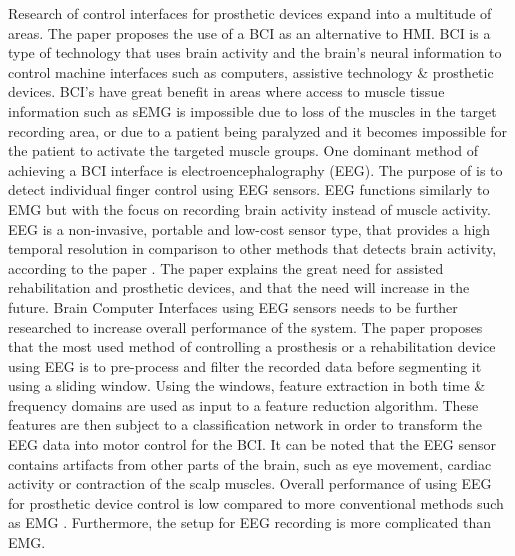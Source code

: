 \documentclass[../main.tex]{subfiles}
\begin{document}
Research of control interfaces for prosthetic devices expand into a multitude of areas.
The paper \cite{fnins2016} proposes the use of a \gls{BCI} as an alternative to \gls{HMI}.
BCI is a type of technology that uses brain activity and the brain's neural information to control machine interfaces such as computers, assistive technology \& prosthetic devices.
BCI's have great benefit in areas where access to muscle tissue information such as sEMG is impossible due to loss of the muscles in the target recording area, or due to a patient being paralyzed and it becomes impossible for the patient to activate the targeted muscle groups.
One dominant method of achieving a BCI interface is electroencephalography (EEG).
The purpose of \cite{fnins2016} is to detect individual finger control using EEG sensors. 
EEG functions similarly to EMG but with the focus on recording brain activity instead of muscle activity.
EEG is a non-invasive, portable and low-cost sensor type, that provides a high temporal resolution in comparison to other methods that detects brain activity, according to the paper \cite{quraishi2018}.
The paper explains the great need for assisted rehabilitation and prosthetic devices, and that the need will increase in the future.
Brain Computer Interfaces using EEG sensors needs to be further researched to increase overall performance of the system.
The paper proposes that the most used method of controlling a prosthesis or a rehabilitation device using EEG is to pre-process and filter the recorded data before segmenting it using a sliding window.
Using the windows, feature extraction in both time \& frequency domains are used as input to a feature reduction algorithm.
These features are then subject to a classification network in order to transform the EEG data into motor control for the BCI.
It can be noted that the EEG sensor contains artifacts from other parts of the brain, such as eye movement, cardiac activity or contraction of the scalp muscles. 
Overall performance of using EEG for prosthetic device control is low compared to more conventional methods such as EMG \cite{quraishi2018}.
Furthermore, the setup for EEG recording is more complicated than EMG.
\end{document}
